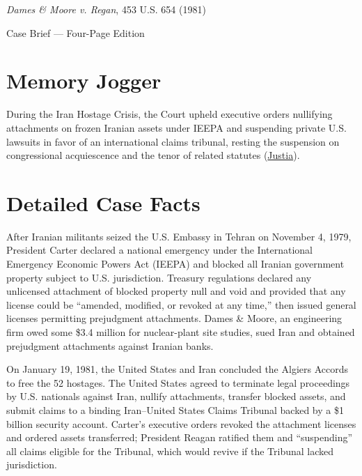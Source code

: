 \documentclass[12pt]{article}
\begin{document}
\begin{center}
{\LARGE \textit{Dames \& Moore v. Regan}, 453 U.S. 654 (1981)\par}
\vspace{0.8em}
{\large Case Brief --- Four-Page Edition\par}
\end{center}
\vspace{1em}

\section{Memory Jogger}

During the Iran Hostage Crisis, the Court upheld executive orders nullifying attachments on frozen Iranian assets under IEEPA and suspending private U.S. lawsuits in favor of an international claims tribunal, resting the suspension on congressional acquiescence and the tenor of related statutes (\href{https://supreme.justia.com/cases/federal/us/453/654/}{Justia}).

\section{Detailed Case Facts}

After Iranian militants seized the U.S. Embassy in Tehran on November 4, 1979, President Carter declared a national emergency under the International Emergency Economic Powers Act (IEEPA) and blocked all Iranian government property subject to U.S. jurisdiction. Treasury regulations declared any unlicensed attachment of blocked property null and void and provided that any license could be ``amended, modified, or revoked at any time,'' then issued general licenses permitting prejudgment attachments. Dames \& Moore, an engineering firm owed some \$3.4 million for nuclear-plant site studies, sued Iran and obtained prejudgment attachments against Iranian banks.

On January 19, 1981, the United States and Iran concluded the Algiers Accords to free the 52 hostages. The United States agreed to terminate legal proceedings by U.S. nationals against Iran, nullify attachments, transfer blocked assets, and submit claims to a binding Iran--United States Claims Tribunal backed by a \$1 billion security account. Carter's executive orders revoked the attachment licenses and ordered assets transferred; President Reagan ratified them and ``suspending'' all claims eligible for the Tribunal, which would revive if the Tribunal lacked jurisdiction.
\end{document}
